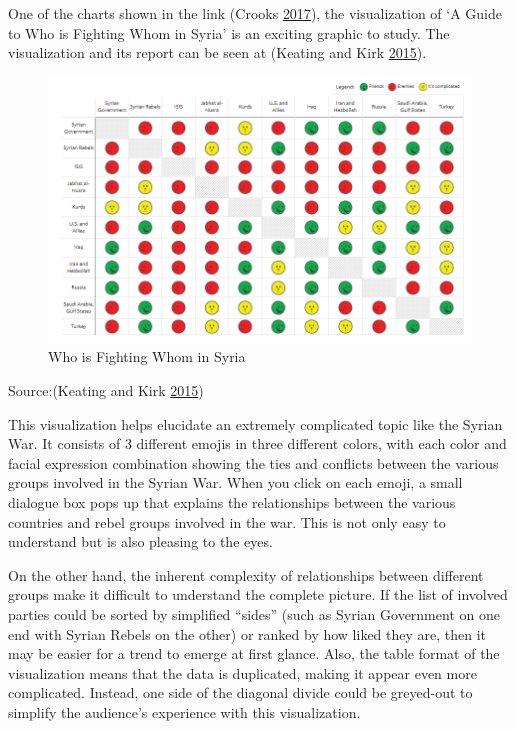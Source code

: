 \documentclass[]{book}
\begin{document}
One of the charts shown in the link (Crooks \protect\hyperlink{ref-int_viz_capt}{2017}), the visualization of `A Guide to Who is Fighting Whom in Syria' is an exciting graphic to study. The visualization and its report can be seen at (Keating and Kirk \protect\hyperlink{ref-syria_chart}{2015}).

\begin{figure}
\centering
\includegraphics{images/img_syria_summary.PNG}
\caption{Who is Fighting Whom in Syria}
\end{figure}

Source:(Keating and Kirk \protect\hyperlink{ref-syria_chart}{2015})

This visualization helps elucidate an extremely complicated topic like the Syrian War. It consists of 3 different emojis in three different colors, with each color and facial expression combination showing the ties and conflicts between the various groups involved in the Syrian War. When you click on each emoji, a small dialogue box pops up that explains the relationships between the various countries and rebel groups involved in the war. This is not only easy to understand but is also pleasing to the eyes.

On the other hand, the inherent complexity of relationships between different groups make it difficult to understand the complete picture. If the list of involved parties could be sorted by simplified ``sides'' (such as Syrian Government on one end with Syrian Rebels on the other) or ranked by how liked they are, then it may be easier for a trend to emerge at first glance. Also, the table format of the visualization means that the data is duplicated, making it appear even more complicated. Instead, one side of the diagonal divide could be greyed-out to simplify the audience's experience with this visualization.
\end{document}
